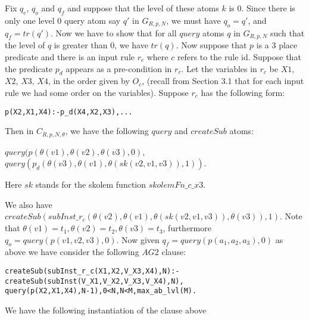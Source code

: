 \documentclass[sigconf]{acmart}
\begin{document}
Fix $q_{c}$, $q_{o}$ and $q_{f}$ and suppose that the level of these atoms $k$ is $0$. Since there is only one level $0$ query atom say $q'$ in $G_{R,p,N}$, we must have $q_{o}=q'$, and $q_{f} = tr(q')$. Now we have to show that for all $query$ atoms $q$ in $G_{R,p,N}$ such that the level of $q$ is greater than $0$, we have $tr(q)$. Now suppose that $p$ is a 3 place predicate and there is an input rule $r_{c}$ where ${c}$ refers to the rule id. Suppose that the predicate $p_{d}$ appears as a pre-condition in $r_{c}$. Let the variables in $r_{c}$ be $X1$, $X2$, $X3$, $X4$, in the order given by $O_{c}$, (recall from Section 3.1 that for each input rule we had some order on the variables). Suppose $r_{c}$ has the following form:
\begin{verbatim}
p(X2,X1,X4):-p_d(X4,X2,X3),...    
\end{verbatim}

Then in $C_{R,p,N,\theta}$, we have the following $query$ and $createSub$ atoms:

$query(p(\theta(v1),\theta(v2),\theta(v3),0)$, $query(p_{d}(\theta(v3),\theta(v1),\theta(sk(v2,v1,v3)),1))$. 

Here $sk$ stands for the skolem function $skolemFn\_c\_x3$. 

We also have $createSub(subInst\_r_{c}(\theta(v2),\theta(v1),\theta(sk(v2,v1,v3)), \theta(v3)),1)$. Note that $\theta(v1)=t_{1},\theta(v2)=t_{2},\theta(v3)=t_{3}$, furthermore $q_{o}= query(p(v1,v2,v3),0)$. Now given $q_{f} = query(p(a_{1},a_{2},a_{3}),0)$ as above we have consider the following $AG2$ clause:
\begin{verbatim}
createSub(subInst_r_c(X1,X2,V_X3,X4),N):-createSub(subInst(V_X1,V_X2,V_X3,V_X4),N),
query(p(X2,X1,X4),N-1),0<N,N<M,max_ab_lvl(M).    
\end{verbatim}
We have the following instantiation of the clause above
\end{document}
